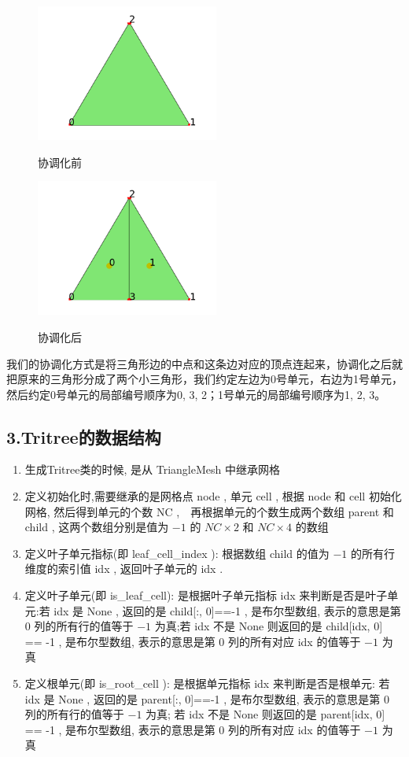\documentclass{article}
\begin{document}
\begin{figure}[H]
\centering
\begin{minipage}[!htbp]{0.3\linewidth}
    \centerline{\includegraphics[width=6cm]{./figures/Figure_31.png}}
    \centerline{协调化前}
\end{minipage}
\hspace{0.25in}		
\begin{minipage}[!htbp]{0.3\linewidth}
    \centerline{\includegraphics[width=6cm]{./figures/Figure_30.png}}
    \centerline{协调化后}
\end{minipage}
\end{figure}
我们的协调化方式是将三角形边的中点和这条边对应的顶点连起来，协调化之后就把原来的三角形分成了两个小三角形，我们约定左边为0号单元，右边为1号单元，然后约定0号单元的局部编号顺序为0, 3, 2；1号单元的局部编号顺序为1, 2, 3。
\subsection{3.Tritree的数据结构}
\begin{enumerate}
\item 生成Tritree类的时候, 是从 TriangleMesh 中继承网格
\item 定义初始化时,需要继承的是网格点 node , 单元 cell , 根据 node 和 cell 初始化网格, 然后得到单元的个数 NC ,　再根据单元的个数生成两个数组 parent 和 child , 这两个数组分别是值为 $-1$ 的 $NC \times 2$ 和 $NC \times 4$ 的数组
\item 定义叶子单元指标(即 leaf\_cell\_index ): 根据数组 child 的值为 $-1$ 的所有行维度的索引值 idx , 返回叶子单元的 idx .
\item 定义叶子单元(即 is\_leaf\_cell): 是根据叶子单元指标 idx 来判断是否是叶子单元:若 idx 是 None , 返回的是 child[:, 0]==-1 , 是布尔型数组, 表示的意思是第 $0$ 列的所有行的值等于 $-1$ 为真;若 idx 不是 None 则返回的是 child[idx, 0] == -1 , 是布尔型数组, 表示的意思是第 $0$ 列的所有对应 idx 的值等于 $-1$ 为真
\item 定义根单元(即 is\_root\_cell ): 是根据单元指标 idx 来判断是否是根单元: 若 idx 是 None , 返回的是 parent[:, 0]==-1 , 是布尔型数组, 表示的意思是第 $0$ 列的所有行的值等于 $-1$ 为真; 若 idx 不是 None 则返回的是 parent[idx, 0] == -1 , 是布尔型数组, 表示的意思是第 $0$ 列的所有对应 idx 的值等于 $-1$ 为真
\end{enumerate}
\end{document}

